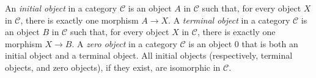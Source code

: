 An {\em initial object} in a category $\mathcal{C}$ is an object $A$ in $\mathcal{C}$ such that, for every object $X$ in $\mathcal{C}$, there is exactly one morphism $A \longrightarrow X$. A {\em terminal object} in a category $\mathcal{C}$ is an object $B$ in $\mathcal{C}$ such that, for every object $X$ in $\mathcal{C}$, there is exactly one morphism $X \longrightarrow B$. A {\em zero object} in a category $\mathcal{C}$ is an object $0$ that is both an initial object and a terminal object. All initial objects (respectively, terminal objects, and zero objects), if they exist, are isomorphic in $\mathcal{C}$.